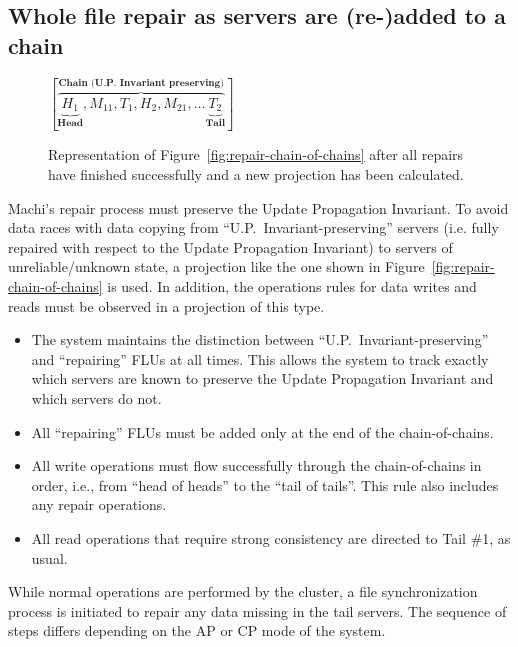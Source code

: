 \documentclass[preprint,10pt]{sigplanconf}
\begin{document}
\subsection{Whole file repair as servers are (re-)added to a chain}
\label{sub:repair-add-to-chain}

\begin{figure}
\centering
$
[\overbrace{\underbrace{H_1}_\textbf{Head}, M_{11}, T_1,
                        H_2, M_{21},
                        \ldots
                        \underbrace{T_2}_\textbf{Tail}}^\textbf{Chain (U.P.~Invariant preserving)}
]
$
\caption{Representation of Figure~\ref{fig:repair-chain-of-chains}
  after all repairs have finished successfully and a new projection has
  been calculated.}
\label{fig:repair-chain-of-chains-finished}
\end{figure}

Machi's repair process must preserve the Update Propagation
Invariant.  To avoid data races with data copying from
``U.P.~Invariant-preserving'' servers (i.e. fully repaired with
respect to the Update Propagation Invariant)
to servers of unreliable/unknown state, a
projection like the one shown in
Figure~\ref{fig:repair-chain-of-chains} is used.  In addition, the
operations rules for data writes and reads must be observed in a
projection of this type.

\begin{itemize}

\item The system maintains the distinction between ``U.P.~Invariant-preserving''
  and ``repairing'' FLUs at all times.  This allows the system to
  track exactly which servers are known to preserve the Update
  Propagation Invariant and which servers do not.

\item All ``repairing'' FLUs must be added only at the end of the
  chain-of-chains.

\item All write operations must flow successfully through the
  chain-of-chains in order, i.e., from ``head of heads''
  to the ``tail of tails''.  This rule also includes any
  repair operations.

\item All read operations that require strong consistency are directed
  to Tail \#1, as usual.

\end{itemize}

While normal operations are performed by the cluster, a file
synchronization process is initiated to repair any data missing in the
tail servers.  The sequence of steps differs depending on the AP or CP
mode of the system.
\end{document}
